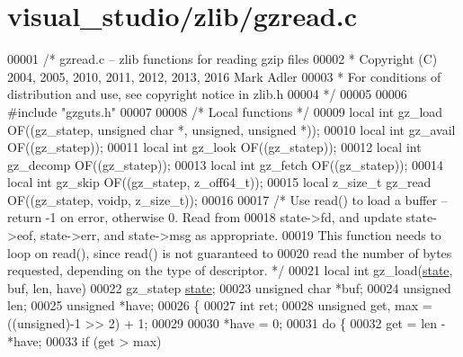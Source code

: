 \hypertarget{visual__studio_2zlib_2gzread_8c_source}{}\section{visual\+\_\+studio/zlib/gzread.c}
\label{visual__studio_2zlib_2gzread_8c_source}

\begin{DoxyCode}
00001 \textcolor{comment}{/* gzread.c -- zlib functions for reading gzip files}
00002 \textcolor{comment}{ * Copyright (C) 2004, 2005, 2010, 2011, 2012, 2013, 2016 Mark Adler}
00003 \textcolor{comment}{ * For conditions of distribution and use, see copyright notice in zlib.h}
00004 \textcolor{comment}{ */}
00005 
00006 \textcolor{preprocessor}{#include "gzguts.h"}
00007 
00008 \textcolor{comment}{/* Local functions */}
00009 local \textcolor{keywordtype}{int} gz\_load OF((gz\_statep, \textcolor{keywordtype}{unsigned} \textcolor{keywordtype}{char} *, \textcolor{keywordtype}{unsigned}, \textcolor{keywordtype}{unsigned} *));
00010 local \textcolor{keywordtype}{int} gz\_avail OF((gz\_statep));
00011 local \textcolor{keywordtype}{int} gz\_look OF((gz\_statep));
00012 local \textcolor{keywordtype}{int} gz\_decomp OF((gz\_statep));
00013 local \textcolor{keywordtype}{int} gz\_fetch OF((gz\_statep));
00014 local \textcolor{keywordtype}{int} gz\_skip OF((gz\_statep, z\_off64\_t));
00015 local z\_size\_t gz\_read OF((gz\_statep, voidp, z\_size\_t));
00016 
00017 \textcolor{comment}{/* Use read() to load a buffer -- return -1 on error, otherwise 0.  Read from}
00018 \textcolor{comment}{   state->fd, and update state->eof, state->err, and state->msg as appropriate.}
00019 \textcolor{comment}{   This function needs to loop on read(), since read() is not guaranteed to}
00020 \textcolor{comment}{   read the number of bytes requested, depending on the type of descriptor. */}
00021 local \textcolor{keywordtype}{int} gz\_load(\hyperlink{structstate}{state}, buf, len, have)
00022     gz\_statep \hyperlink{structstate}{state};
00023     \textcolor{keywordtype}{unsigned} \textcolor{keywordtype}{char} *buf;
00024     \textcolor{keywordtype}{unsigned} len;
00025     \textcolor{keywordtype}{unsigned} *have;
00026 \{
00027     \textcolor{keywordtype}{int} ret;
00028     \textcolor{keywordtype}{unsigned} \textcolor{keyword}{get}, max = ((unsigned)-1 >> 2) + 1;
00029 
00030     *have = 0;
00031     \textcolor{keywordflow}{do} \{
00032         \textcolor{keyword}{get} = len - *have;
00033         \textcolor{keywordflow}{if} (\textcolor{keyword}{get} > max)

\end{DoxyCode}
